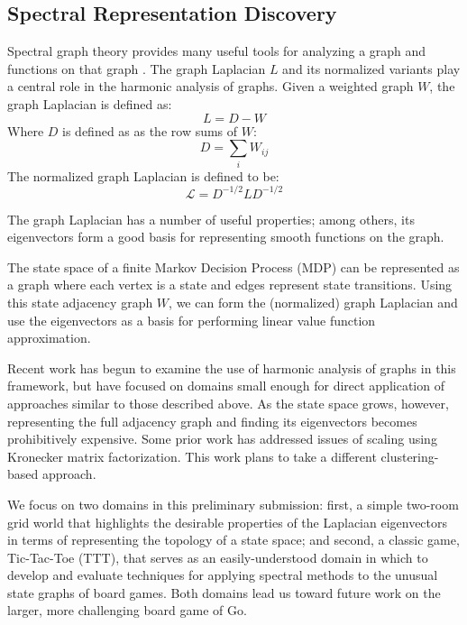 \subsection{Spectral Representation Discovery}

Spectral graph theory provides many useful tools for analyzing a graph and
functions on that graph \citep{Chung1997Spectral}. The graph Laplacian $L$ and
its normalized variants play a central role in the harmonic analysis of graphs.
Given a weighted graph $W$, the graph Laplacian is defined as:
%
\begin{equation}
L = D-W
\end{equation}
%
Where $D$ is defined as as the row sums of $W$:
%
\begin{equation}
D = \sum_{i} W_{ij}
\end{equation}
%
The normalized graph Laplacian is defined to be:
%
\begin{equation}
\mathcal{L} = D^{-1/2}LD^{-1/2}
\label{eqn:norm.laplacian}
\end{equation}

The graph Laplacian has a number of useful properties; among others, its
eigenvectors form a good basis for representing smooth functions on the graph.

The state space of a finite Markov Decision Process (MDP) can be represented
as a graph where each vertex is a state and edges represent state transitions.
Using this state adjacency graph $W$, we can form the (normalized) graph 
Laplacian and use the eigenvectors as a basis for performing linear value 
function approximation.

Recent work \citep{petrik2007analysis,mahadevan2006learning,Mahadevan2006Value,mahadevan2007proto}
has begun to examine the use of harmonic analysis of graphs in this framework,
but have focused on domains small enough for direct application of approaches
similar to those described above. As the state space grows, however, 
representing the full adjacency graph and finding its eigenvectors becomes 
prohibitively expensive. Some prior work has addressed issues of scaling 
\citep{johns2007compact} using Kronecker matrix factorization. This work plans
to take a different clustering-based approach.

We focus on two domains in this preliminary submission: first, a simple
two-room grid world that highlights the desirable properties of the Laplacian
eigenvectors in terms of representing the topology of a state space; and
second, a classic game, Tic-Tac-Toe (TTT), that serves as an easily-understood
domain in which to develop and evaluate techniques for applying spectral
methods to the unusual state graphs of board games. Both domains lead us toward
future work on the larger, more challenging board game of Go.

